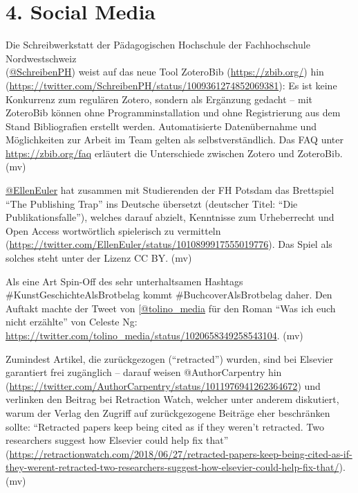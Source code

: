 \documentclass[a4paper,
fontsize=11pt,
oneside,
numbers=noperiodatend,
parskip=half-,
bibliography=totoc,
final
]{scrartcl}
\begin{document}
\hypertarget{social-media}{%
\section{4. Social Media}\label{social-media}}

Die Schreibwerkstatt der Pädagogischen Hochschule der Fachhochschule
Nordwestschweiz \\(\href{https://twitter.com/SchreibenPH}{@SchreibenPH})
weist auf das neue Tool ZoteroBib (\url{https://zbib.org/}) hin
(\url{https://twitter.com/SchreibenPH/status/1009361274852069381}): Es
ist keine Konkurrenz zum regulären Zotero, sondern als Ergänzung gedacht
-- mit ZoteroBib können ohne Programminstallation und ohne Registrierung
aus dem Stand Bibliografien erstellt werden. Automatisierte
Datenübernahme und Möglichkeiten zur Arbeit im Team gelten als
selbstverständlich. Das FAQ unter \url{https://zbib.org/faq} erläutert
die Unterschiede zwischen Zotero und ZoteroBib. (mv)

\href{https://twitter.com/EllenEuler}{@EllenEuler} hat zusammen mit
Studierenden der FH Potsdam das Brettspiel \enquote{The Publishing Trap}
ins Deutsche übersetzt (deutscher Titel: \enquote{Die
Publikationsfalle}), welches darauf abzielt, Kenntnisse zum Urheberrecht
und Open Access wortwörtlich spielerisch zu vermitteln
(\url{https://twitter.com/EllenEuler/status/1010899917555019776}). Das
Spiel als solches steht unter der Lizenz CC BY. (mv)

Als eine Art Spin-Off des sehr unterhaltsamen Hashtags
\#KunstGeschichteAlsBrotbelag kommt \#BuchcoverAlsBrotbelag daher. Den
Auftakt machte der Tweet von
{[}\href{https://twitter.com/tolino_media}{@tolino\_media} für den Roman
\enquote{Was ich euch nicht erzählte} von Celeste Ng:
\url{https://twitter.com/tolino_media/status/1020658349258543104}. (mv)

Zumindest Artikel, die zurückgezogen (\enquote{retracted}) wurden, sind
bei Elsevier garantiert frei zugänglich -- darauf weisen
@AuthorCarpentry hin
(\url{https://twitter.com/AuthorCarpentry/status/1011976941262364672})
und verlinken den Beitrag bei Retraction Watch, welcher unter anderem
diskutiert, warum der Verlag den Zugriff auf zurückgezogene Beiträge
eher beschränken sollte: \enquote{Retracted papers keep being cited as
if they weren't retracted. Two researchers suggest how Elsevier could
help fix that}
(\url{https://retractionwatch.com/2018/06/27/retracted-papers-keep-being-cited-as-if-they-werent-retracted-two-researchers-suggest-how-elsevier-could-help-fix-that/}).
(mv)
\end{document}
